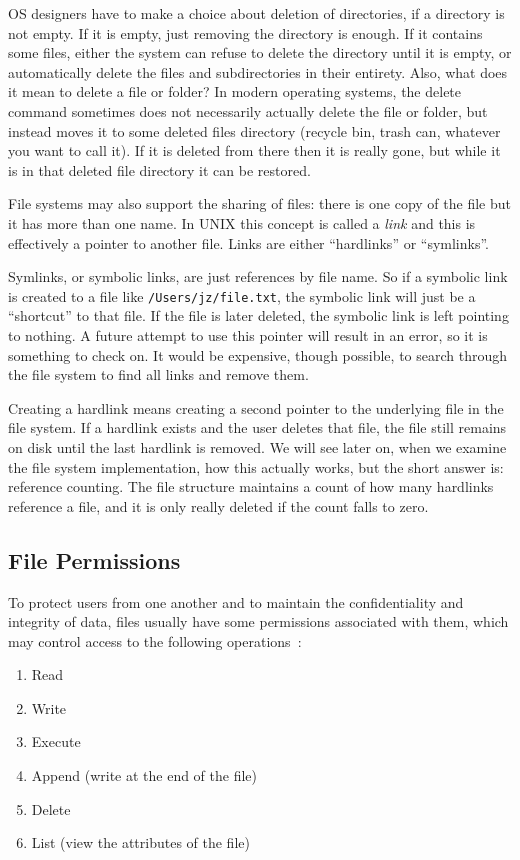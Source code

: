 OS designers have to make a choice about deletion of directories, if a directory is not empty. If it is empty, just removing the directory is enough. If it contains some files, either the system can refuse to delete the directory until it is empty, or automatically delete the files and subdirectories in their entirety. Also, what does it mean to delete a file or folder? In modern operating systems, the delete command sometimes does not necessarily actually delete the file or folder, but instead moves it to some deleted files directory (recycle bin, trash can, whatever you want to call it). If it is deleted from there then it is really gone, but while it is in that deleted file directory it can be restored.

File systems may also support the sharing of files: there is one copy of the file but it has more than one name. In UNIX this concept is called a \textit{link} and this is effectively a pointer to another file. Links are either ``hardlinks'' or ``symlinks''. 

Symlinks, or symbolic links, are just references by file name. So if a symbolic link is created to a file like \texttt{/Users/jz/file.txt}, the symbolic link will just be a ``shortcut'' to that file. If the file is later deleted, the symbolic link is left pointing to nothing. A future attempt to use this pointer will result in an error, so it is something to check on. It would be expensive, though possible, to search through the file system to find all links and remove them.

Creating a hardlink means creating a second pointer to the underlying file in the file system. If a hardlink exists and the user deletes that file, the file still remains on disk until the last hardlink is removed. We will see later on, when we examine the file system implementation, how this actually works, but the short answer is: reference counting. The file structure maintains a count of how many hardlinks reference a file, and it is only really deleted if the count falls to zero.

\subsection*{File Permissions}
To protect users from one another and to maintain the confidentiality and integrity of data, files usually have some permissions associated with them, which may control access to the following operations~\cite{osc}:

\begin{enumerate}
	\item Read
	\item Write
	\item Execute
	\item Append (write at the end of the file)
	\item Delete
	\item List (view the attributes of the file)
\end{enumerate} 

